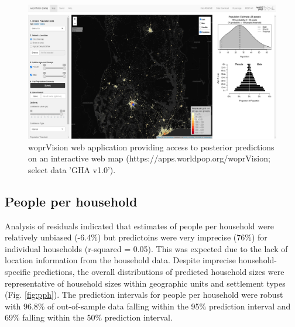 \documentclass[]{book}
\begin{document}
\begin{figure}

{\centering \includegraphics[width=1\linewidth]{dat/GHAv1/woprVision} 

}

\caption{woprVision web application providing access to posterior predictions on an interactive web map (https://apps.worldpop.org/woprVision; select data 'GHA v1.0').}\label{fig:woprVision}
\end{figure}

\subsection{People per household}\label{people-per-household}

Analysis of residuals indicated that estimates of people per household
were relatively unbiased (-6.4\%) but predictoins were very imprecise
(76\%) for individual households (r-squared = 0.05). This was expected
due to the lack of location information from the household data. Despite
imprecise household-specific predictions, the overall distributions of
predicted household sizes were representative of household sizes within
geographic units and settlement types (Fig. \ref{fig:pph}). The
prediction intervals for people per household were robust with 96.8\% of
out-of-sample data falling within the 95\% prediction interval and 69\%
falling within the 50\% prediction interval.
\end{document}
